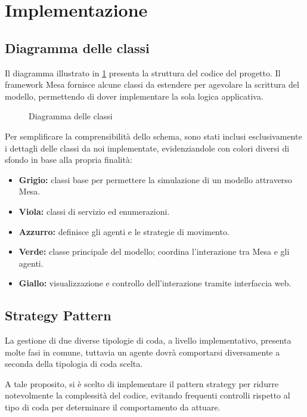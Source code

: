 \section{Implementazione}

\subsection{Diagramma delle classi}
Il diagramma illustrato in \cref{fig:class-diagram} presenta la struttura del codice del progetto. Il framework Mesa fornisce alcune classi da estendere per agevolare la scrittura del modello, permettendo di dover implementare la sola logica applicativa.

\begin{figure}[H]
    \caption{Diagramma delle classi}
    \label{fig:class-diagram}
\end{figure}

\noindent
Per semplificare la comprensibilità dello schema, sono stati inclusi esclusivamente i dettagli delle classi da noi implementate, evidenziandole con colori diversi di sfondo in base alla propria finalità:
\begin{itemize}
    \item \textbf{Grigio:} classi base per permettere la simulazione di un modello attraverso Mesa.
    \item \textbf{Viola:} classi di servizio ed enumerazioni.
    \item \textbf{Azzurro:} definisce gli agenti e le strategie di movimento.
    \item \textbf{Verde:} classe principale del modello; coordina l'interazione tra Mesa e gli agenti.
    \item \textbf{Giallo:} visualizzazione e controllo dell'interazione tramite interfaccia web.
\end{itemize}

\subsection{Strategy Pattern}
La gestione di due diverse tipologie di coda, a livello implementativo, presenta molte fasi in comune, tuttavia un agente dovrà comportarsi diversamente a seconda della tipologia di coda scelta.

A tale proposito, si è scelto di implementare il pattern strategy per ridurre notevolmente la complessità del codice, evitando frequenti controlli rispetto al tipo di coda per determinare il comportamento da attuare.
